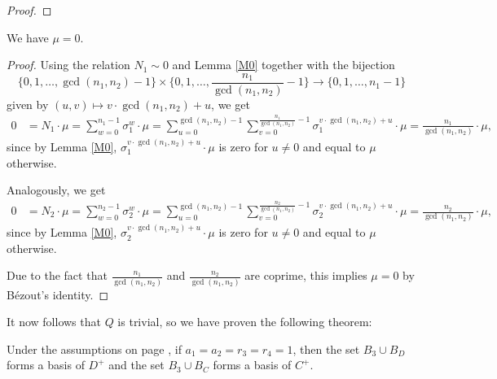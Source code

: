 \begin{proof}
\end{proof}

\begin{prop}
We have $\mu=0.$
\end{prop}
\begin{proof}
Using the relation $N_1\sim 0$ and Lemma \ref{M0} together with the bijection $$\{0,1,\dots,\gcd(n_1,n_2)-1\}\times \{0,1,\dots,\frac{n_1}{\gcd(n_1,n_2)}-1\}\to \{0,1,\dots, n_1-1\}$$
given by $(u,v)\mapsto v\cdot \gcd(n_1,n_2)+u$, we get
\begin{align*}
0&=N_1\cdot \mu=\sum_{w=0}^{n_1-1}\sigma_1^w\cdot \mu=\sum_{u=0}^{\gcd(n_1,n_2)-1}\sum_{v=0}^{\frac{n_1}{\gcd(n_1,n_2)}-1}\sigma_1^{ v\cdot \gcd(n_1,n_2)+u}\cdot \mu
=\frac{n_1}{\gcd(n_1,n_2)}\cdot \mu,
\end{align*}
since by Lemma \ref{M0}, $\sigma_1^{ v\cdot \gcd(n_1,n_2)+u}\cdot \mu$ is zero for $u\neq 0$ and equal to $\mu$ otherwise.

Analogously, we get 
\begin{align*}
0&=N_2\cdot \mu=\sum_{w=0}^{n_2-1}\sigma_2^w\cdot \mu=\sum_{u=0}^{\gcd(n_1,n_2)-1}\sum_{v=0}^{\frac{n_2}{\gcd(n_1,n_2)}-1}\sigma_2^{ v\cdot \gcd(n_1,n_2)+u}\cdot \mu
=\frac{n_2}{\gcd(n_1,n_2)}\cdot \mu,
\end{align*}
since by Lemma \ref{M0}, $\sigma_2^{ v\cdot \gcd(n_1,n_2)+u}\cdot \mu$ is zero for $u\neq 0$ and equal to $\mu$ otherwise.

Due to the fact that $\frac{n_1}{\gcd(n_1,n_2)}$ and $\frac{n_2}{\gcd(n_1,n_2)}$ are coprime, this implies $\mu=0$ by Bézout's identity.
\end{proof}
It now follows that $Q$ is trivial, so we have proven the following theorem:
\begin{theorem}
Under the assumptions on page \pageref{assum}, if $a_1=a_2=r_3=r_4=1$, then the set $B_{3}\cup B_D$ forms a basis of $D^+$ and the set $B_{3}\cup B_C$ forms a basis of $C^+$.
\end{theorem}

